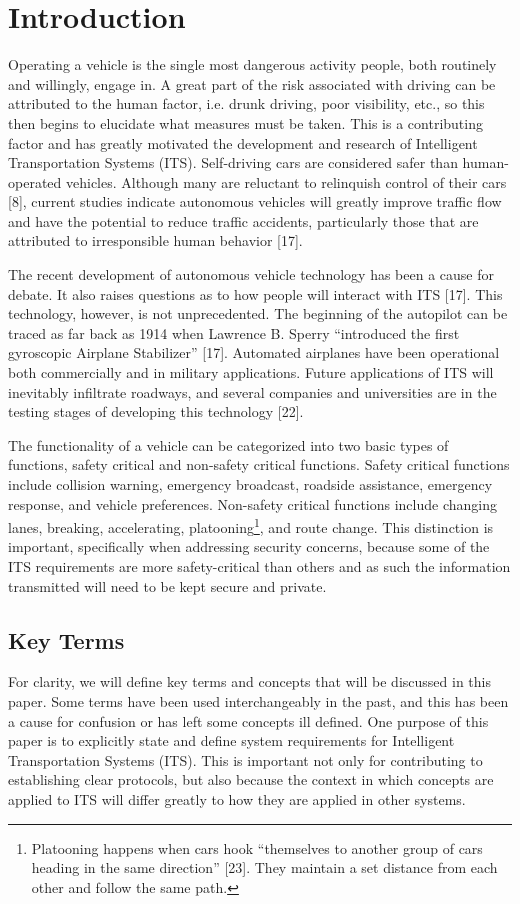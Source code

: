 \documentclass[conference,compsoc]{IEEEtran}
\begin{document}
\section{Introduction}
Operating a vehicle is the single most dangerous activity people, both routinely and willingly, engage in. A great part of the risk associated with driving can be attributed to the human factor, i.e. drunk driving, poor visibility, etc., so this then begins to elucidate what measures must be taken. This is a contributing factor and has greatly motivated the development and research of Intelligent Transportation Systems (ITS). Self-driving cars are considered safer than human-operated vehicles. Although many are reluctant to relinquish control of their cars [8], current studies indicate autonomous vehicles will greatly improve traffic flow and have the potential to reduce traffic accidents, particularly those that are attributed to irresponsible human behavior [17]. 

The recent development of autonomous vehicle technology has been a cause for debate. It also raises questions as to how people will interact with ITS [17]. This technology, however, is not unprecedented. The beginning of the autopilot can be traced as far back as 1914 when Lawrence B. Sperry “introduced the first gyroscopic Airplane Stabilizer” [17]. Automated airplanes have been operational both commercially and in military applications. Future applications of ITS will inevitably infiltrate roadways, and several companies and universities are in the testing stages of developing this technology [22].  

The functionality of a vehicle can be categorized into two basic types of functions, safety critical and non-safety critical functions. Safety critical functions include collision warning, emergency broadcast, roadside assistance, emergency response, and vehicle preferences.  Non-safety critical functions include changing lanes, breaking, accelerating, platooning\footnote {Platooning happens when cars hook “themselves to another group of cars heading in the same direction” [23]. They maintain a set distance from each other and follow the same path.}, and route change. This distinction is important, specifically when addressing security concerns, because some of the ITS requirements are more safety-critical than others and as such the information transmitted will need to be kept secure and private.

\subsection{Key Terms}
For clarity, we will define key terms and concepts that will be discussed in this paper. Some terms have been used interchangeably in the past, and this has been a cause for confusion or has left some concepts ill defined. One purpose of this paper is to explicitly state and define system requirements for Intelligent Transportation Systems (ITS). This is important not only for contributing to establishing clear protocols, but also because the context in which concepts are applied to ITS will differ greatly to how they are applied in other systems.
\end{document}
